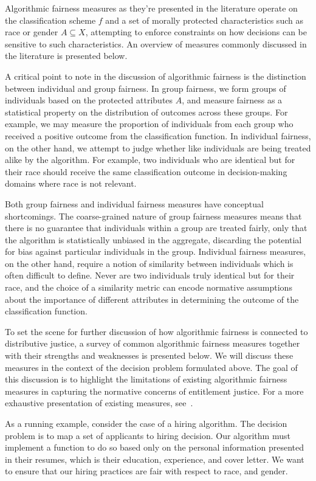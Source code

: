 Algorithmic fairness measures as they're presented in the literature operate on
the classification scheme $f$ and a set of morally protected characteristics
such as race or gender $A \subseteq X$, attempting to enforce constraints on how 
decisions can be sensitive to such characteristics. An overview of measures
commonly discussed in the literature is presented below.

A critical point to note in the discussion of algorithmic fairness is the 
distinction between individual and group fairness. In group fairness, we form
groups of individuals based on the protected attributes $A$, and measure
fairness as a statistical property on the distribution of outcomes across these
groups. For example, we may measure the proportion of individuals from each
group who received a positive outcome from the classification function. In
individual fairness, on the other hand, we attempt to judge whether like
individuals are being treated alike by the algorithm. For example, two
individuals who are identical but for their race should receive the same
classification outcome in decision-making domains where race is not relevant. 

Both group fairness and individual fairness measures have conceptual
shortcomings. The coarse-grained nature of group fairness measures means that
there is no guarantee that individuals within a group are treated fairly, only
that the algorithm is statistically unbiased in the aggregate, discarding
the potential for bias against particular individuals in the group. Individual
fairness measures, on the other hand, require a notion of similarity between
individuals which is often difficult to define. Never are two individuals
truly identical but for their race, and the choice of a similarity metric can
encode normative assumptions about the importance of different attributes in
determining the outcome of the classification function.

To set the scene for further discussion of how algorithmic fairness is 
connected to distributive justice, a survey of common algorithmic fairness 
measures together with their strengths and weaknesses is presented below.
We will discuss these measures in the context of the decision problem formulated
above. The goal of this discussion is to highlight the limitations of
existing algorithmic fairness measures in capturing the normative concerns of 
entitlement justice. For a more exhaustive presentation of existing measures,
see~\cite{CorbettDavies_2023}.

As a running example, consider the case of a hiring algorithm. The decision
problem is to map a set of applicants to hiring decision. Our algorithm must
implement a function to do so based only on the personal information presented
in their resumes, which is their education, experience, and cover letter. We
want to ensure that our hiring practices are fair with respect to race, and
gender. 


